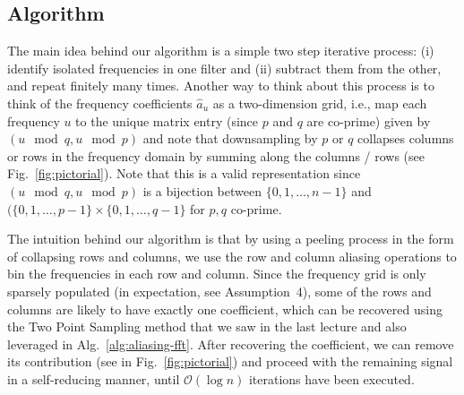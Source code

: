 \documentclass[11pt]{article}
\theoremstyle{case}
\newcommand{\Bigo}{\mathcal{O}}
\begin{document}
\subsection{Algorithm}
The main idea behind our algorithm is a simple two step iterative process: (i) identify isolated frequencies in one filter and (ii) subtract them from the other, and repeat finitely many times. Another way to think about this process is to think of the frequency coefficients $\hat{a}_u$ as a two-dimension grid, i.e., map each frequency $u$ to the unique matrix entry (since $p$ and $q$ are co-prime) given by $(u \mod q, u \mod p)$ and note that downsampling by $p$ or $q$ collapses columns or rows in the frequency domain by summing along the columns / rows (see Fig.~\ref{fig:pictorial}). Note that this is a valid representation since $(u \mod q, u \mod p)$ is a bijection between $\{0, 1, \ldots, n-1\}$ and $(\{0, 1, \ldots, p-1\} \times \{0,1,\ldots, q-1\}$ for $p,q$ co-prime.

The intuition behind our algorithm is that by using a peeling process in the form of collapsing rows and columns, we use the row and column aliasing operations to bin the frequencies in each row and column. Since the frequency grid is only sparsely populated (in expectation, see Assumption~4), some of the rows and columns are likely to have exactly one coefficient, which can be recovered using the Two Point Sampling method that we saw in the last lecture and also leveraged in Alg.~\ref{alg:aliasing-fft}. After recovering the coefficient, we can remove its contribution (see in Fig.~\ref{fig:pictorial}) and proceed with the remaining signal in a self-reducing manner, until $\Bigo(\log n)$ iterations have been executed.
\end{document}
